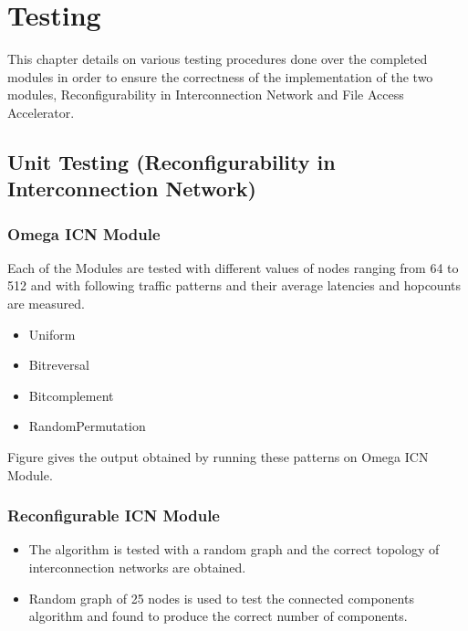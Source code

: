 
\chapter{Testing} %
\label{Chapter5}

This chapter details on various testing procedures done over the completed modules in order to ensure the correctness of the implementation of the two modules, Reconfigurability in Interconnection Network and File Access Accelerator.

\section{Unit Testing (Reconfigurability in Interconnection Network)}

  \subsection{Omega ICN Module}
 Each of the Modules are tested with different values of nodes ranging from 64 to 512 and with following traffic patterns and their average latencies and hopcounts are measured.
   \begin{itemize}
        \item Uniform
        \item Bitreversal
        \item Bitcomplement
        \item RandomPermutation
   \end{itemize}

Figure %
 gives the output obtained by running these patterns on Omega ICN Module.


  \subsection{Reconfigurable ICN Module}
     \begin{itemize}
        \item The algorithm is tested with a random graph and the correct topology of interconnection networks are obtained.
       \item Random graph of 25 nodes is used to test the connected components algorithm and found to produce the correct number of components.
     \end{itemize}

